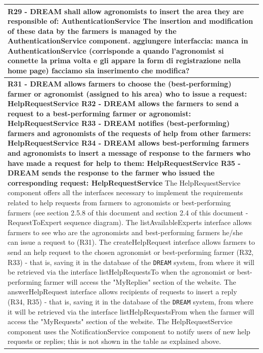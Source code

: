 \documentclass{article}
\begin{document}
\begin{longtable}[c]{|m{11.75cm}|}
    \textbf{R29 - DREAM shall allow agronomists to insert the area they are responsible of: AuthenticationService}
    \newline\newline
    The insertion and modification of these data by the farmers is managed by the AuthenticationService component.
    \color{red}
    aggiungere interfaccia: manca in AuthenticationService (corrisponde a quando l'agronomist si connette la prima volta e gli appare la form di registrazione nella home page)
    facciamo sia inserimento che modifica?
    \color{black} \\
    \hline
    
    \textbf{R31 - DREAM allows farmers to choose the (best-performing) farmer or agronomist (assigned to his area) who to issue a request: HelpRequestService
    \newline\newline
    R32 - DREAM allows the farmers to send a request to a best-performing farmer or agronomist: HelpRequestService
    \newline\newline
    R33 - DREAM notifies (best-performing) farmers and agronomists of the requests of help from other farmers: HelpRequestService
    \newline\newline
    R34 - DREAM allows best-performing farmers and agronomists to insert a message of response to the farmers who have made a request for help to them: HelpRequestService
    \newline\newline
    R35 - DREAM sends the response to the farmer who issued the corresponding request: HelpRequestService}
    \newline\newline
    The HelpRequestService component offers all the interfaces necessary to implement the requirements related to help requests from farmers to agronomists or best-performing farmers (see section 2.5.8 of this document  and section 2.4 of this document - RequestToExpert sequence diagram). The listAvailableExperts interface allows farmers to see who are the agronomists and best-performing farmers he/she can issue a request to (R31). The createHelpRequest interface allows farmers to send an help request to the chosen agronomist or best-performing farmer (R32, R33) - that is, saving it in the database of the \verb|DREAM| system, from where it will be retrieved via the interface listHelpRequestsTo when the agronomist or best-performing farmer will access the "MyReplies" section of the website. The answerHelpRequest interface allows recipients of requests to insert a reply (R34, R35) - that is, saving it in the database of the \verb|DREAM| system, from where it will be retrieved via the interface listHelpRequestsFrom when the farmer will access the "MyRequests" section of the website. The HelpRequestService component uses the NotificationService component to notify users of new help requests or replies; this is not shown in the table as explained above.

\end{longtable}
\end{document}
